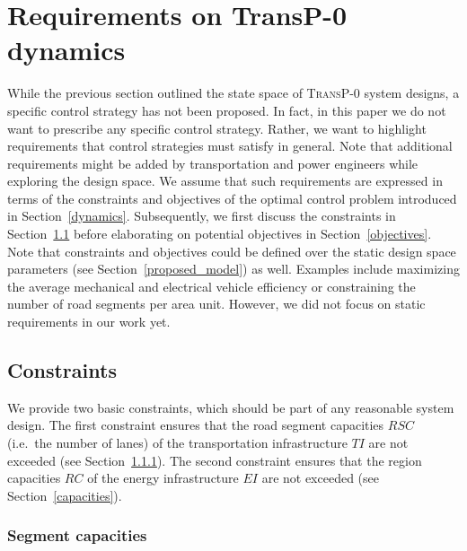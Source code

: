 \section{Requirements on \textbf{TransP-0} dynamics}
\label{requirements}

While the previous section outlined the state space of \textsc{TransP-0} system designs, a specific control strategy has not been proposed. In fact, in this paper we do not want to prescribe any specific control strategy. Rather, we want to highlight requirements that control strategies must satisfy in general. Note that additional requirements might be added by transportation and power engineers while exploring the design space. We assume that such requirements are expressed in terms of the constraints and objectives of the optimal control problem introduced in Section~\ref{dynamics}. Subsequently, we first discuss the constraints in Section~\ref{constraints} before elaborating on potential objectives in Section~\ref{objectives}. Note that constraints and objectives could be defined over the static design space parameters (see Section~\ref{proposed_model}) as well. Examples include maximizing the average mechanical and electrical vehicle efficiency or constraining the number of road segments per area unit. However, we did not focus on static requirements in our work yet.

\subsection{Constraints}
\label{constraints}

We provide two basic constraints, which should be part of any reasonable system design. The first constraint ensures that the road segment capacities $RSC$ (i.e.\ the number of lanes) of the transportation infrastructure $TI$ are not exceeded (see Section~\ref{collisions}). The second constraint ensures that the region capacities $RC$ of the energy infrastructure $EI$ are not exceeded (see Section~\ref{capacities}).

\subsubsection{Segment capacities}
\label{collisions}

